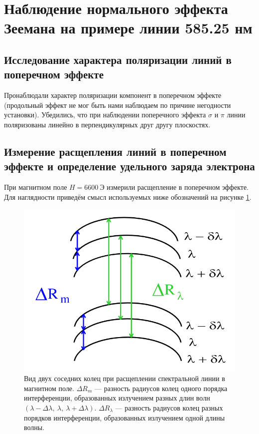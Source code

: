\documentclass[12pt]{article}
\begin{document}
	\section{Наблюдение нормального эффекта Зеемана на примере линии 585.25 нм}
	\subsection{Исследование характера поляризации линий в поперечном эффекте}
	Пронаблюдали характер поляризации компонент в поперечном эффекте (продольный эффект не мог быть нами наблюдаем по причине негодности установки). Убедились, что при наблюдении поперечного эффекта $\sigma$ и $\pi$ линии поляризованы линейно в перпендикулярных друг другу плоскостях.

	\subsection{Измерение расщепления линий в поперечном эффекте и определение удельного заряда электрона}
	При магнитном поле $H = 6600\ \text{Э}$ измерили расщепление в поперечном эффекте. Для наглядности приведём смысл используемых ниже обозначений на рисунке \ref{fig:figure2}.
	\begin{figure}[htbp]
		\centering
		\includegraphics[width=1\linewidth]{../images/2.png}
		\caption{Вид двух соседних колец при расщеплении спектральной линии в магнитном поле. $\Delta R_m$ \---- разность радиусов колец одного порядка интерференции, образованных излучением разных длин волн $(\lambda-\Delta\lambda,\:\lambda,\:\lambda+\Delta\lambda)$. $\Delta R_\lambda$ \---- разность радиусов колец разных порядков интерференции, образованных излучением одной длины волны.}
		\label{fig:figure2}
	\end{figure}
\end{document}
